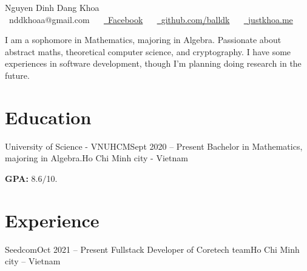 



\vspace*{-0.3cm}
\begin{center}
    {\color{primary-color}\Huge Nguyen Dinh Dang Khoa} \\[5mm]
    {\raisebox{-0.1\height}\faEnvelope\ nddkhoaa@gmail.com}
    \vspace{-8pt} ~~
    \href{https://facebook.com/nddkhoaaa}{\raisebox{-0.1\height}\faFacebook\ {Facebook}} ~~
    \href{https://github.com/balldk}{\raisebox{-0.1\height}\faGithub\ {github.com/balldk}} ~~
    \href{https://justkhoa.me/}{\raisebox{-0.1\height}\faGlobe\ {justkhoa.me}}
    \vspace{-8pt}
\end{center}
\vspace{1cm}
I am a sophomore in Mathematics, majoring in Algebra. Passionate about abstract maths, theoretical computer science, and cryptography. I have some experiences in software development, though I'm planning doing research in the future.
\vspace{-2mm}

\section{Education}
\resumeSubHeadingListStart

\resumeSubheading
{University of Science - VNUHCM}{Sept 2020 -- Present}
{Bachelor in Mathematics, majoring in Algebra.}{Ho Chi Minh city - Vietnam}\\
\item{\small\textbf{GPA:} 8.6$/$10.}

\resumeSubHeadingListEnd
\vspace{-4pt}

\section{Experience}
\resumeSubHeadingListStart

\resumeSubheading
{Seedcom}{Oct 2021 -- Present}
{Fullstack Developer of Coretech team}{Ho Chi Minh city -- Vietnam}
\resumeItemListStart
{}
\resumeItemListEnd

